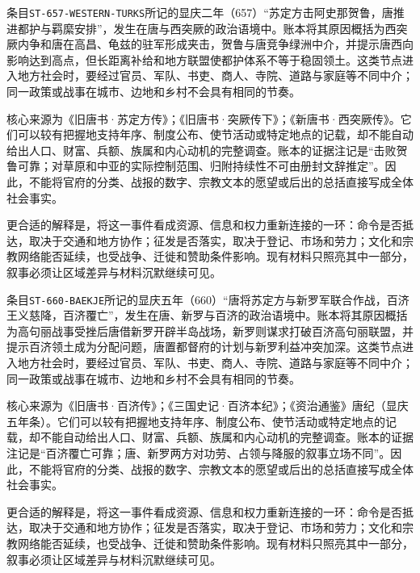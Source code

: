 
条目\texttt{ST-657-WESTERN-TURKS}所记的显庆二年（657）“苏定方击阿史那贺鲁，唐推进都护与羁縻安排”，发生在唐与西突厥的政治语境中。账本将其原因概括为西突厥内争和唐在高昌、龟兹的驻军形成夹击，贺鲁与唐竞争绿洲中介，并提示唐西向影响达到高点，但长距离补给和地方联盟使都护体系不等于稳固领土。这类节点进入地方社会时，要经过官员、军队、书吏、商人、寺院、道路与家庭等不同中介；同一政策或战事在城市、边地和乡村不会具有相同的节奏。

核心来源为《旧唐书·苏定方传》；《旧唐书·突厥传下》；《新唐书·西突厥传》。它们可以较有把握地支持年序、制度公布、使节活动或特定地点的记载，却不能自动给出人口、财富、兵额、族属和内心动机的完整调查。账本的证据注记是“击败贺鲁可靠；对草原和中亚的实际控制范围、归附持续性不可由册封文辞推定”。因此，不能将官府的分类、战报的数字、宗教文本的愿望或后出的总括直接写成全体社会事实。

更合适的解释是，将这一事件看成资源、信息和权力重新连接的一环：命令是否抵达，取决于交通和地方协作；征发是否落实，取决于登记、市场和劳力；文化和宗教网络能否延续，也受战争、迁徙和赞助条件影响。现有材料只照亮其中一部分，叙事必须让区域差异与材料沉默继续可见。


条目\texttt{ST-660-BAEKJE}所记的显庆五年（660）“唐将苏定方与新罗军联合作战，百济王义慈降，百济覆亡”，发生在唐、新罗与百济的政治语境中。账本将其原因概括为高句丽战事受挫后唐借新罗开辟半岛战场，新罗则谋求打破百济高句丽联盟，并提示百济领土成为分配问题，唐置都督府的计划与新罗利益冲突加深。这类节点进入地方社会时，要经过官员、军队、书吏、商人、寺院、道路与家庭等不同中介；同一政策或战事在城市、边地和乡村不会具有相同的节奏。

核心来源为《旧唐书·百济传》；《三国史记·百济本纪》；《资治通鉴》唐纪（显庆五年条）。它们可以较有把握地支持年序、制度公布、使节活动或特定地点的记载，却不能自动给出人口、财富、兵额、族属和内心动机的完整调查。账本的证据注记是“百济覆亡可靠；唐、新罗两方对功劳、占领与降服的叙事立场不同”。因此，不能将官府的分类、战报的数字、宗教文本的愿望或后出的总括直接写成全体社会事实。

更合适的解释是，将这一事件看成资源、信息和权力重新连接的一环：命令是否抵达，取决于交通和地方协作；征发是否落实，取决于登记、市场和劳力；文化和宗教网络能否延续，也受战争、迁徙和赞助条件影响。现有材料只照亮其中一部分，叙事必须让区域差异与材料沉默继续可见。


